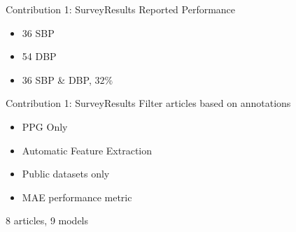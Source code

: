 \begin{frame}{Contribution 1: Survey}{Results}
    Reported Performance

    \begin{figure}
        
        
    \end{figure}

    \begin{itemize}
        \item 36 SBP
        \item 54 DBP
        \item 36 SBP \& DBP, $32\%$
    \end{itemize}
\end{frame}

\begin{frame}{Contribution 1: Survey}{Results}
    Filter articles based on annotations
    \begin{itemize}
        \item PPG Only
        \item Automatic Feature Extraction
        \item Public datasets only
        \item MAE performance metric
    \end{itemize}

    \pause
    \alert{8 articles, 9 models}
\end{frame}

